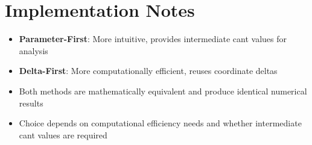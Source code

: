 \documentclass{article}
\begin{document}
\section{Implementation Notes}
\begin{itemize}
\item \textbf{Parameter-First}: More intuitive, provides intermediate cant values for analysis
\item \textbf{Delta-First}: More computationally efficient, reuses coordinate deltas
\item Both methods are mathematically equivalent and produce identical numerical results
\item Choice depends on computational efficiency needs and whether intermediate cant values are required
\end{itemize}
\end{document}
